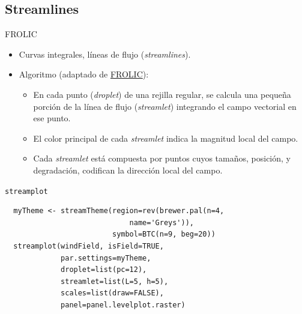 \documentclass[xcolor={usenames,svgnames,dvipsnames}]{beamer}
\begin{document}
\subsection{Streamlines}
\label{sec-5-3}
\begin{frame}[label=sec-5-3-1]{FROLIC}
\begin{itemize}
\item Curvas integrales, líneas de flujo (\emph{streamlines}).
\item Algoritmo (adaptado de \href{https://www.cg.tuwien.ac.at/research/vis-dyn-syst/frolic/frolic_crc.pdf}{FROLIC}):
\begin{itemize}
\item En cada punto (\emph{droplet}) de una
rejilla regular, se calcula una pequeña porción de la línea de
flujo (\emph{streamlet}) integrando el campo vectorial en ese punto.
\item El color principal de cada \emph{streamlet} indica la magnitud local del campo.
\item Cada \emph{streamlet} está compuesta por puntos cuyos tamaños,
posición, y degradación, codifican la dirección local del campo.
\end{itemize}
\end{itemize}
\end{frame}

\begin{frame}[fragile,label=sec-5-3-2]{\texttt{streamplot}}
 \lstset{language=R,label= ,caption= ,numbers=none}
\begin{lstlisting}
  myTheme <- streamTheme(region=rev(brewer.pal(n=4,
                             name='Greys')),
                         symbol=BTC(n=9, beg=20))
  streamplot(windField, isField=TRUE,
             par.settings=myTheme,
             droplet=list(pc=12),
             streamlet=list(L=5, h=5),
             scales=list(draw=FALSE),
             panel=panel.levelplot.raster)
\end{lstlisting}
\end{frame}
\end{document}
